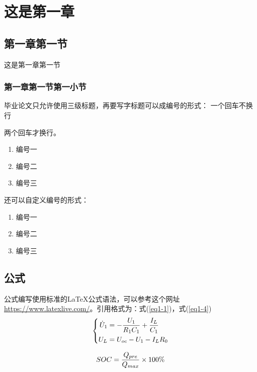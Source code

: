 \chapter{这是第一章}

\section{第一章第一节}
这是第一章第一节

\subsection{第一章第一节第一小节}
毕业论文只允许使用三级标题，再要写字标题可以成编号的形式：
一个回车不换行

两个回车才换行。
\begin{enumerate}
\item 编号一
\item 编号二
\item 编号三
\end{enumerate}
还可以自定义编号的形式：
\begin{enumerate}[自定义1：]
\item 编号一
\item 编号二
\item 编号三
\end{enumerate}
\section{公式}
公式编写使用标准的{\LaTeX}公式语法，可以参考这个网址\url{https://www.latexlive.com/}。引用格式为：式(\ref{eq1-1})，式(\ref{eq1-4})
\begin{equation}
\left \{ \begin{aligned}
\dot U_1 &=  - {{{U_1}} \over {{R_1}{C_1}}} + {{{I_L}} \over {{C_1}}} \\
U_L &= {U_{oc}} - {U_1} - {I_L}{R_0}
\end{aligned}
\right.
\label{eq1-1}
\end{equation}

\begin{equation}
SOC= {Q_{pre} \over Q_{max}}\times 100\% \label{eq1-4}
\end{equation}

